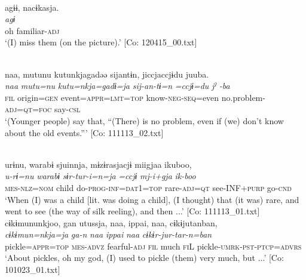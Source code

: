  \ex\relax [= (4-50 a)]\\
    \glll  agɨɨ,  nacɨkasja.\\
      \textit{agɨ}  \textit{}\\
      oh  familiar-\textsc{adj}\\
      \glt       ‘(I) miss them (on the picture).’ [Co: 120415\_00.txt]

 \ex\relax  [= (8-104 a)]\\
    \glll  naa,  mutunu  kutunkjagadəə  sijantɨn,  jiccjaccjɨdu  juuba.\\
      \textit{naa}  \textit{mutu=nu}  \textit{kutu=nkja=gadɨ=ja}  \textit{sij-an-tɨ=n}     \textit{=ccjɨ=du}  \textit{jˀ} \textit{-ba}\\
      \textsc{fil}  origin=\textsc{gen}  event=\textsc{appr}=\textsc{lmt}=\textsc{top}  know-\textsc{neg}-\textsc{seq}=even  no.problem-\textsc{adj}=\textsc{qt}=\textsc{foc}  say-\textsc{csl}\\
      \glt       ‘(Younger people) say that, “(There) is no problem, even if (we) don’t know about the old events.”’ [Co: 111113\_02.txt]

\ex{}\\
    \glll  urɨnu,  warabɨ  sjuinnja,  mɨzɨrasjacjɨ  miigjaa  ikuboo,\\
      \textit{u-rɨ=nu}  \textit{warabɨ}  \textit{sɨr-tur-i=n=ja}  \textit{=ccjɨ}     \textit{mj-i+gja}  \textit{ik-boo}\\
      \textsc{mes}-\textsc{nlz}=\textsc{nom}  child  do-\textsc{prog}-\textsc{inf}=\textsc{dat}1=\textsc{top}  rare-\textsc{adj}=\textsc{qt}   see-INF+\textsc{purp}  go-\textsc{cnd}      \\
      \glt       ‘When (I) was a child [lit. was doing a child], (I thought) that (it was) rare, and went to see (the way of silk reeling), and then ...’ [Co: 111113\_01.txt]
\ex %
\glll      cɨkɨmununkjoo,  gan  utussja,  naa,  ippai,  naa,  cɨkɨjutanban,\\
      \textit{cɨkɨmun=nkja=ja}  \textit{ga-n}  \textit{}  \textit{naa}  \textit{ippai}  \textit{naa}  \textit{cɨkɨr-jur-tar-n=ban}\\
      pickle=\textsc{appr}=\textsc{top}  \textsc{mes}-\textsc{advz}  fearful-\textsc{adj}  \textsc{fil}  much  \textsc{fi}L    pickle-\textsc{umrk}-\textsc{pst}-\textsc{ptcp}=\textsc{advrs}\\
      \glt       ‘About pickles, oh my god, (I) used to pickle (them) very much, but ...’ [Co: 101023\_01.txt]

